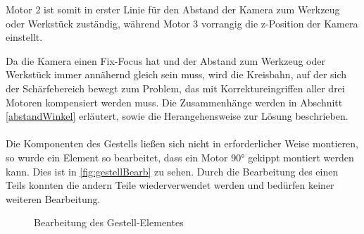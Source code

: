 \documentclass[12pt,a4paper,bibliography=totocnumbered,listof=totocnumbered]{scrartcl}
\begin{document}
Motor 2 ist somit in erster Linie für den Abstand der Kamera zum Werkzeug oder Werkstück zuständig, während Motor 3 vorrangig die z-Position der Kamera einstellt.

Da die Kamera einen Fix-Focus hat und der Abstand zum Werkzeug oder Werkstück immer annähernd gleich sein muss, wird die Kreisbahn, auf der sich der Schärfebereich bewegt zum Problem, das mit Korrektureingriffen aller drei Motoren kompensiert werden muss. Die Zusammenhänge werden in Abschnitt \ref{abstandWinkel} erläutert, sowie die Herangehensweise zur Lösung beschrieben.\\\\
Die Komponenten des Gestells ließen sich nicht in erforderlicher Weise montieren, so wurde ein Element so bearbeitet, dass ein Motor 90° gekippt montiert werden kann. Dies ist in \autoref{fig:gestellBearb} zu sehen. Durch die Bearbeitung des einen Teils konnten die andern Teile wiederverwendet werden und bedürfen keiner weiteren Bearbeitung.
\begin{figure}
	\centering
	\caption{Bearbeitung des Gestell-Elementes} 
	\label{fig:gestellBearb}
\end{figure} 
\end{document}

